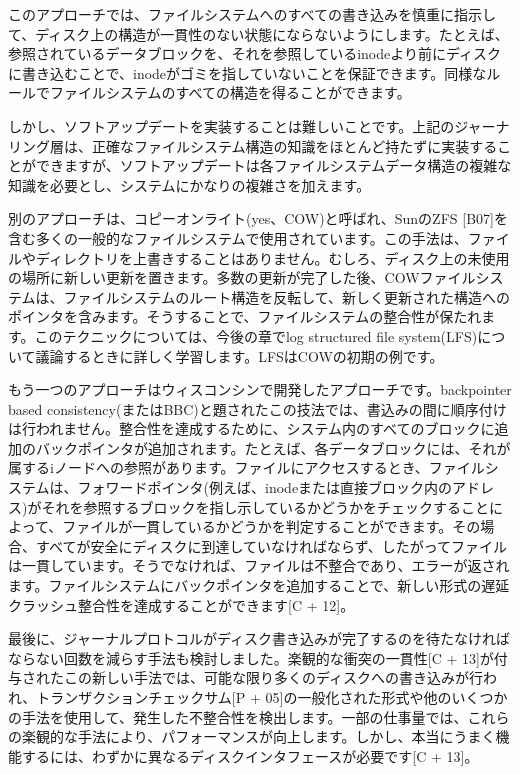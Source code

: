 このアプローチでは、ファイルシステムへのすべての書き込みを慎重に指示して、ディスク上の構造が一貫性のない状態にならないようにします。たとえば、参照されているデータブロックを、それを参照しているinodeより前にディスクに書き込むことで、inodeがゴミを指していないことを保証できます。同様なルールでファイルシステムのすべての構造を得ることができます。

しかし、ソフトアップデートを実装することは難しいことです。上記のジャーナリング層は、正確なファイルシステム構造の知識をほとんど持たずに実装することができますが、ソフトアップデートは各ファイルシステムデータ構造の複雑な知識を必要とし、システムにかなりの複雑さを加えます。

別のアプローチは、コピーオンライト(yes、COW)と呼ばれ、SunのZFS
{[}B07{]}を含む多くの一般的なファイルシステムで使用されています。この手法は、ファイルやディレクトリを上書きすることはありません。むしろ、ディスク上の未使用の場所に新しい更新を置きます。多数の更新が完了した後、COWファイルシステムは、ファイルシステムのルート構造を反転して、新しく更新された構造へのポインタを含みます。そうすることで、ファイルシステムの整合性が保たれます。このテクニックについては、今後の章でlog
structured file
system(LFS)について議論するときに詳しく学習します。LFSはCOWの初期の例です。

もう一つのアプローチはウィスコンシンで開発したアプローチです。backpointer
based
consistency(またはBBC)と題されたこの技法では、書込みの間に順序付けは行われません。整合性を達成するために、システム内のすべてのブロックに追加のバックポインタが追加されます。たとえば、各データブロックには、それが属するiノードへの参照があります。ファイルにアクセスするとき、ファイルシステムは、フォワードポインタ(例えば、inodeまたは直接ブロック内のアドレス)がそれを参照するブロックを指し示しているかどうかをチェックすることによって、ファイルが一貫しているかどうかを判定することができます。その場合、すべてが安全にディスクに到達していなければならず、したがってファイルは一貫しています。そうでなければ、ファイルは不整合であり、エラーが返されます。ファイルシステムにバックポインタを追加することで、新しい形式の遅延クラッシュ整合性を達成することができます{[}C
+ 12{]}。

最後に、ジャーナルプロトコルがディスク書き込みが完了するのを待たなければならない回数を減らす手法も検討しました。楽観的な衝突の一貫性{[}C
+
13{]}が付与されたこの新しい手法では、可能な限り多くのディスクへの書き込みが行われ、トランザクションチェックサム{[}P
+
05{]}の一般化された形式や他のいくつかの手法を使用して、発生した不整合性を検出します。一部の仕事量では、これらの楽観的な手法により、パフォーマンスが向上します。しかし、本当にうまく機能するには、わずかに異なるディスクインタフェースが必要です{[}C
+ 13{]}。

